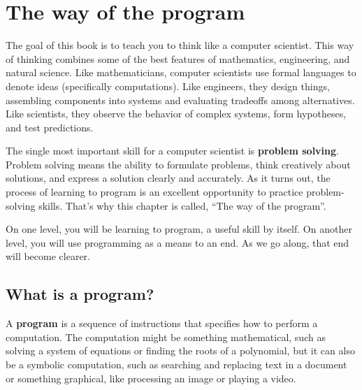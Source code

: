 \documentclass[10pt]{book}
\begin{document}
\normalsize
\clearemptydoublepage

\begin{latexonly}

\tableofcontents

\clearemptydoublepage

\end{latexonly}

\mainmatter

\chapter{The way of the program}

The goal of this book is to teach you to think like a computer
scientist.  This way of thinking combines some of the best features of
mathematics, engineering, and natural science.  Like mathematicians,
computer scientists use formal languages to denote ideas (specifically
computations).  Like engineers, they design things, assembling
components into systems and evaluating tradeoffs among alternatives.
Like scientists, they observe the behavior of complex systems, form
hypotheses, and test predictions.  

The single most important skill for a computer scientist is {\bf
  problem solving}.  Problem solving means the ability to formulate
problems, think creatively about solutions, and express a solution
clearly and accurately.  As it turns out, the process of learning to
program is an excellent opportunity to practice problem-solving
skills.  That's why this chapter is called, ``The way of the
program''.

On one level, you will be learning to program, a useful skill by
itself.  On another level, you will use programming as a means to an
end.  As we go along, that end will become clearer.


\section{What is a program?}

A {\bf program} is a sequence of instructions that specifies how to
perform a computation.  The computation might be something
mathematical, such as solving a system of equations or finding the
roots of a polynomial, but it can also be a symbolic computation, such
as searching and replacing text in a document or something
graphical, like processing an image or playing a video.
\end{document}
